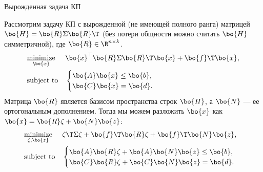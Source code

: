 \documentclass{beamer}
\begin{document}
\begin{frame}{Вырожденная задача КП}
	\begin{flushleft}
		
		Рассмотрим задачу КП с вырожденной (не имеющей полного ранга) матрицей $\bo{H} = \bo{R} \Sigma \bo{R}\T$ (без потери общности можно считать $\bo{H}$ симметричной), где $\bo{R} \in \R^{n \times k}$.
		\begin{equation}
			\begin{aligned}
				& \underset{\bo{x}}{\text{minimize}}
				& & \bo{x}^\top \bo{R} \Sigma \bo{R}\T \bo{x} + \bo{f}\T\bo{x}, \\
				& \text{subject to}
				& & \begin{cases}
					\bo{A}\bo{x} \leq \bo{b}, \\
					\bo{C}\bo{x} = \bo{d}.
				\end{cases}
			\end{aligned}
		\end{equation}
		Матрица $\bo{R}$ является базисом пространства строк $\bo{H}$, а $\bo{N}$ — ее ортогональным дополнением. Тогда мы можем разложить $\bo{x}$ как $\bo{x} = \bo{R}\zeta+\bo{N}\bo{z}$:
		\begin{equation}
			\begin{aligned}
				& \underset{\zeta, \bo{z}}{\text{minimize}}
				& & \zeta\T \Sigma \zeta + \bo{f}\T\bo{R}\zeta+\bo{f}\T\bo{N}\bo{z}, \\
				& \text{subject to}
				& & \begin{cases}
					\bo{A}\bo{R}\zeta+\bo{A}\bo{N}\bo{z} \leq \bo{b}, \\
					\bo{C}\bo{R}\zeta+\bo{C}\bo{N}\bo{z} = \bo{d}.
				\end{cases}
			\end{aligned}
		\end{equation}
		
	\end{flushleft}
\end{frame}












%
%
\end{document}
